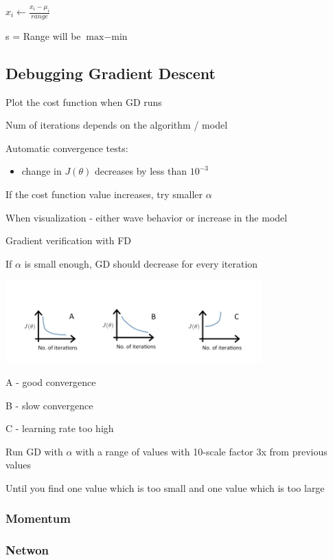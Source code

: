 $x_i \leftarrow \frac{x_i-\mu_i}{range}$

s = Range will be $\text{max}-\text{min}$

\subsection{Debugging Gradient Descent}

Plot the cost function when GD runs

Num of iterations depends on the algorithm / model

Automatic convergence tests:

\begin{itemize}
\item change in $J(\theta)$ decreases by less than $10^{-3}$
\end{itemize}

If the cost function value increases, try smaller $\alpha$

When visualization - either wave behavior or increase in the model

Gradient verification with FD

If $\alpha$ is small enough, GD should decrease for every iteration

\includegraphics{ml_figures/convergence.png}

A - good convergence

B - slow convergence

C - learning rate too high

Run GD with $\alpha$ with a range of values with 10-scale factor  3x from previous values

Until you find one value which is too small and one value which is too large

\subsubsection{Momentum}

\subsubsection{Netwon}

